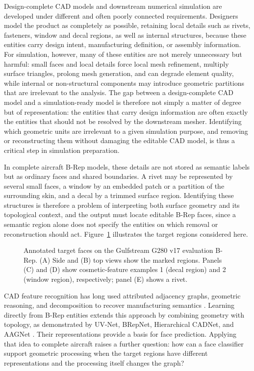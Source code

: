 \documentclass[12pt,a4paper]{article}
\begin{document}
Design-complete CAD models and downstream numerical simulation are developed under different and often poorly connected requirements. Designers model the product as completely as possible, retaining local details such as rivets, fasteners, window and decal regions, as well as internal structures, because these entities carry design intent, manufacturing definition, or assembly information. For simulation, however, many of these entities are not merely unnecessary but harmful: small faces and local details force local mesh refinement, multiply surface triangles, prolong mesh generation, and can degrade element quality, while internal or non-structural components may introduce geometric partitions that are irrelevant to the analysis. The gap between a design-complete CAD model and a simulation-ready model is therefore not simply a matter of degree but of representation: the entities that carry design information are often exactly the entities that should not be resolved by the downstream mesher. Identifying which geometric units are irrelevant to a given simulation purpose, and removing or reconstructing them without damaging the editable CAD model, is thus a critical step in simulation preparation.

In complete aircraft B-Rep models, these details are not stored as semantic labels but as ordinary faces and shared boundaries. A rivet may be represented by several small faces, a window by an embedded patch or a partition of the surrounding skin, and a decal by a trimmed surface region. Identifying these structures is therefore a problem of interpreting both surface geometry and its topological context, and the output must locate editable B-Rep faces, since a semantic region alone does not specify the entities on which removal or reconstruction should act. Figure~\ref{fig:gulfstream_target_examples} illustrates the target regions considered here.

\begin{figure}[!htbp]

\caption{Annotated target faces on the Gulfstream G280 v17 evaluation B-Rep. (A) Side and (B) top views show the marked regions. Panels (C) and (D) show cosmetic-feature examples 1 (decal region) and 2 (window region), respectively; panel (E) shows a rivet.}\label{fig:gulfstream_target_examples}
\end{figure}

CAD feature recognition has long used attributed adjacency graphs, geometric reasoning, and decomposition to recover manufacturing semantics \parencite{han2000manufacturing,shah2001discourse,babic2008review}. Learning directly from B-Rep entities extends this approach by combining geometry with topology, as demonstrated by UV-Net, BRepNet, Hierarchical CADNet, and AAGNet \parencite{jayaraman2021uvnet,lambourne2021brepnet,colligan2022hierarchical,wu2024aagnet}. Their representations provide a basis for face prediction. Applying that idea to complete aircraft raises a further question: how can a face classifier support geometric processing when the target regions have different representations and the processing itself changes the graph?
\end{document}
